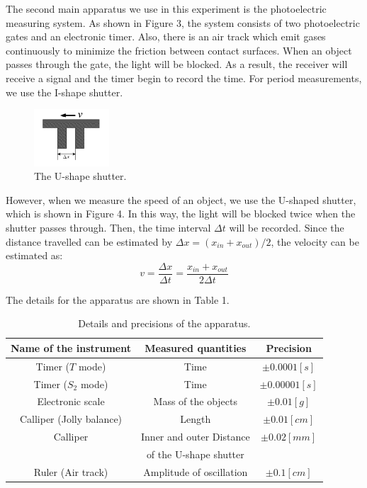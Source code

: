 \documentclass[a4paper,12pt]{article}
\begin{document}
\par The second main apparatus we use in this experiment is the photoelectric measuring system. As shown in Figure 3, the system consists of two photoelectric gates and an electronic timer. Also, there is an air track which emit gases continuously to minimize the friction between contact surfaces. When an object passes through the gate, the light will be blocked. As a result, the receiver will receive a signal and the timer begin to record the time. For period measurements, we use the I-shape shutter.

\begin{figure}[h] 
    \centering
    \includegraphics[width=0.25\textwidth]{Fig4} 
    \caption{The U-shape shutter. \cite{labmanual}} 
\end{figure}

\par However, when we measure the speed of an object, we use the U-shaped shutter, which is shown in Figure 4. In this way, the light will be blocked twice when the shutter passes through. Then, the time interval $\Delta t$ will be recorded. Since the distance travelled can be estimated by $\Delta x = (x_{in} + x_{out})/2$, the velocity can be estimated as:
\begin{equation}
v = \frac{\Delta x}{\Delta t} = \frac{x_{in} + x_{out}}{2\Delta t}
\end{equation}

\newpage
\par The details for the apparatus are shown in Table 1.

\begin{table}[h]
\begin{center}
\begin{tabular}{ccc}
\hline
Name of the instrument & Measured quantities & Precision \\
\hline
Timer ($T$ mode) & Time & $\pm 0.0001 [s]$ \\
Timer ($S_2$ mode) & Time & $\pm 0.00001 [s]$ \\
Electronic scale & Mass of the objects & $\pm 0.01 [g]$ \\
Calliper (Jolly balance) & Length & $\pm 0.01[cm]$ \\
Calliper & Inner and outer Distance  & $\pm 0.02 [mm]$ \\ & of the U-shape shutter \\
Ruler (Air track) & Amplitude of oscillation & $\pm 0.1 [cm]$ \\
\hline
\end{tabular}
\end{center}
\caption{Details and precisions of the apparatus.}
\end{table}
\end{document}
